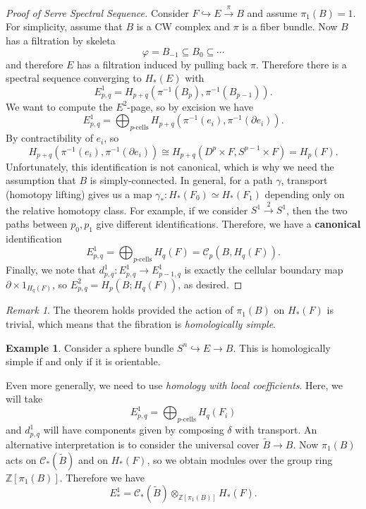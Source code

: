 \documentclass[leqno, openany]{memoir}
\theoremstyle{definition}
\newtheorem{exm}[thm]{Example}
\theoremstyle{remark}
\newtheorem{rmk}[thm]{Remark}
\theoremstyle{plain}
\theoremstyle{definition}
\theoremstyle{remark}
\newcommand{\Z}{\mathbb{Z}}
\newcommand{\mc}[1]{\mathcal{#1}}
\newcommand{\wt}[1]{\widetilde{#1}}
\begin{document}
\begin{proof}[Proof of Serre Spectral Sequence] Consider $F \hookrightarrow E
    \xrightarrow{\pi} B$ and assume $\pi_1(B) = 1$. For simplicity, assume that
    $B$ is a CW complex and $\pi$ is a fiber bundle. Now $B$ has a filtration
    by skeleta \[ \varphi = B_{-1} \subseteq B_0 \subseteq \cdots \] and
    therefore $E$ has a filtration induced by pulling back $\pi$. Therefore
    there is a spectral sequence converging to $H_*(E)$ with \[ E_{p,q}^1 =
    H_{p+q}(\pi^{-1}(B_p), \pi^{-1}(B_{p-1})). \] We want to compute the
    $E^2$-page, so by excision we have \[ E_{p,q}^1 =
        \bigoplus_{\text{$p$-cells}} H_{p+q}(\pi^{-1}(e_i), \pi^{-1}(\partial
        e_i)). \] By contractibility of $e_i$, so \[ H_{p+q}(\pi^{-1}(e_i),
    \pi^{-1}(\partial e_i)) \cong H_{p+q}(D^p \times F, S^{p-1} \times F) =
H_p(F). \] Unfortunately, this identification is not canonical, which is why we
need the assumption that $B$ is simply-connected. In general, for a path
$\gamma$, transport (homotopy lifting) gives us a map $\gamma_* \colon H_*(F_0)
\simeq H_*(F_1)$ depending only on the relative homotopy class. For example, if
we consider $S^1 \xrightarrow{2} S^1$, then the two paths between $p_0, p_1$
give different identifications. Therefore, we have a \textbf{canonical}
identification \[ E_{p,q}^1 = \bigoplus_{\text{$p$-cells}} H_q(F) = \mc{C}_p(B,
H_q(F)). \] Finally, we note that $d_{p,q}^1 \colon E_{p,q}^1 \to E_{p-1,q}^1$
is exactly the cellular boundary map $\partial \times 1_{H_q(F)}$, so
$E_{p,q}^2 = H_p(B; H_q(F))$, as desired.  \end{proof}

\begin{rmk} The theorem holds provided the action of $\pi_1(B)$ on $H_*(F)$ is
trivial, which means that the fibration is \textit{homologically simple}.
\end{rmk}

\begin{exm} Consider a sphere bundle $S^n \hookrightarrow E \to B$. This is
homologically simple if and only if it is orientable.  \end{exm}

Even more generally, we need to use \textit{homology with local coefficients}.
Here, we will take \[ E_{p,q}^1 = \bigoplus_{\text{$p$-cells}} H_q(F_i) \] and
$d_{p,q}^1$ will have components given by composing $\delta$ with transport. An
alternative interpretation is to consider the universal cover $\wt{B} \to B$.
Now $\pi_1(B)$ acts on $\mc{C}_*(\wt{B})$ and on $H_*(F)$, so we obtain modules
over the group ring $\Z[\pi_1(B)]$. Therefore we have \[ E^1_* =
\mc{C}_*(\wt{B}) \otimes_{\Z[\pi_1(B)]} H_*(F). \]
\end{document}
